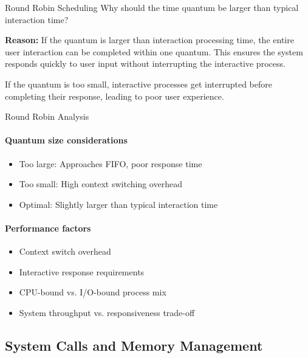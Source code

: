 \begin{example2}{Round Robin Scheduling}
    Why should the time quantum be larger than typical interaction time?
    
    \tcblower
    
    \textbf{Reason:}
    If the quantum is larger than interaction processing time, the entire user interaction can be completed within one quantum. This ensures the system responds quickly to user input without interrupting the interactive process.
    
    If the quantum is too small, interactive processes get interrupted before completing their response, leading to poor user experience.
\end{example2}

\begin{KR}{Round Robin Analysis}
    \paragraph{Quantum size considerations}
    \begin{itemize}
        \item Too large: Approaches FIFO, poor response time
        \item Too small: High context switching overhead
        \item Optimal: Slightly larger than typical interaction time
    \end{itemize}
    
    \paragraph{Performance factors}
    \begin{itemize}
        \item Context switch overhead
        \item Interactive response requirements
        \item CPU-bound vs. I/O-bound process mix
        \item System throughput vs. responsiveness trade-off
    \end{itemize}
\end{KR}

\subsection{System Calls and Memory Management}

